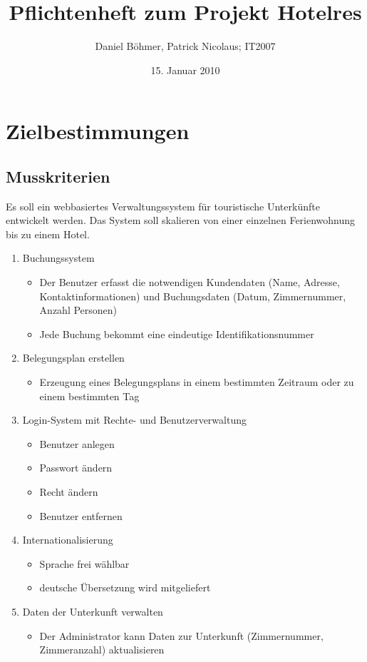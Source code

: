 \documentclass[a4paper,oneside]{scrreprt}
\date{15. Januar 2010}
\author{Daniel Böhmer, Patrick Nicolaus; IT2007}
\title{Pflichtenheft zum Projekt Hotelres}
\begin{document}
\maketitle{}

\tableofcontents{}



\chapter{Zielbestimmungen}

\section{Musskriterien}

Es soll ein webbasiertes Verwaltungssystem für touristische Unterkünfte entwickelt werden. Das System soll skalieren von einer einzelnen Ferienwohnung bis zu einem Hotel.

\begin{enumerate}
\item Buchungssystem
    \begin{itemize}
    \item Der Benutzer erfasst die notwendigen Kundendaten (Name, Adresse, Kontaktinformationen) und Buchungsdaten (Datum, Zimmernummer, Anzahl Personen)
    \item Jede Buchung bekommt eine eindeutige Identifikationsnummer
    \end{itemize}

\item Belegungsplan erstellen
    \begin{itemize}
    \item Erzeugung eines Belegungsplans in einem bestimmten Zeitraum oder zu einem bestimmten Tag 
    \end{itemize}

\item Login-System mit Rechte- und Benutzerverwaltung
    \begin{itemize}
    \item Benutzer anlegen
    \item Passwort ändern
    \item Recht ändern
    \item Benutzer entfernen
    \end{itemize}

\item Internationalisierung
    \begin{itemize}
    \item Sprache frei wählbar
    \item deutsche Übersetzung wird mitgeliefert
    \end{itemize}

\item Daten der Unterkunft verwalten
    \begin{itemize}
    \item Der Administrator kann Daten zur Unterkunft (Zimmernummer, Zimmeranzahl) aktualisieren
    \end{itemize}
\end{enumerate}
\end{document}
